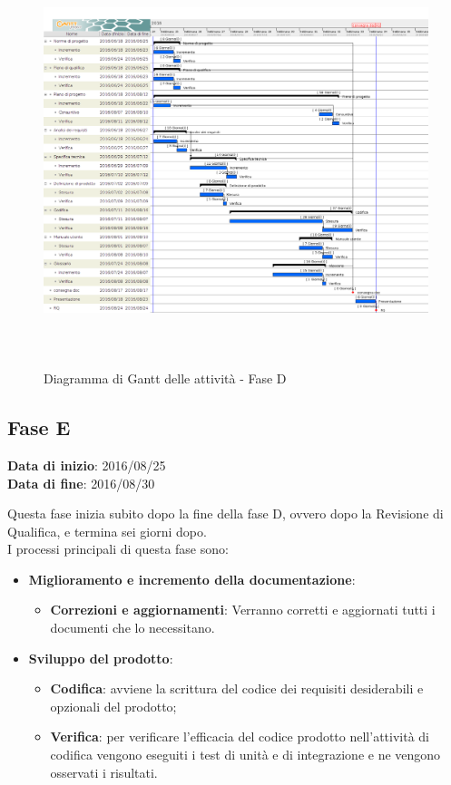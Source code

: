 		\begin{figure}[!h]
			\centering
			\includegraphics[height=12cm, width=15cm]{img/gantt/PDC} 
			\caption{Diagramma di Gantt delle attività - Fase D}
		\end{figure}
		
	\subsection{Fase E}
	\begin{center}
		\textbf{Data di inizio}: 2016/08/25 \\
		\textbf{Data di fine}: 2016/08/30 \\
	\end{center}
	Questa fase inizia subito dopo la fine della fase D, ovvero dopo la Revisione di Qualifica, e termina sei giorni dopo. \\
	I processi principali di questa fase sono: 
		\begin{itemize}
			\item \textbf{Miglioramento e incremento della documentazione}:
			\att
			\begin{itemize}
				\item \textbf{Correzioni e aggiornamenti}: Verranno corretti e aggiornati tutti i documenti che lo necessitano. 
			\end{itemize}
			\item \textbf{Sviluppo del prodotto}:
			\att
			\begin{itemize}
				\item \textbf{Codifica}: avviene la scrittura del codice dei requisiti desiderabili e opzionali del prodotto;
				\item \textbf{Verifica}: per verificare l'efficacia del codice prodotto nell'attività di codifica vengono eseguiti i test di unità e di integrazione e ne vengono osservati i risultati. 
			\end{itemize}
		\end{itemize}

